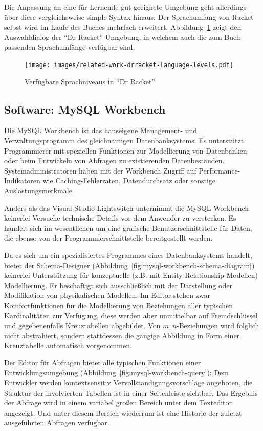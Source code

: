 Die Anpassung an eine für Lernende gut geeignete Umgebung geht allerdings über diese vergleichsweise simple Syntax hinaus: Der Sprachumfang von Racket selbst wird im Laufe des Buches mehrfach erweitert. Abbildung~\ref{fig:drracket-language-levels} zeigt den Auswahldialog der ``Dr Racket''-Umgebung, in welchem auch die zum Buch passenden Sprachumfänge verfügbar sind.

\begin{figure}[h]
  \centering \texttt{[image: images/related-work-drracket-language-levels.pdf]}
  \caption{Verfügbare Sprachniveaus in ``Dr Racket''}
  \label{fig:drracket-language-levels}
\end{figure}

\cleartoleftpage

\subsection{Software: MySQL Workbench}

Die MySQL Workbench ist das hauseigene Management- und Verwaltungsprogramm des gleichnamigen Datenbanksystems. Es unterstützt Programmierer mit speziellen Funktionen zur Modellierung von Datenbanken oder beim Entwickeln von Abfragen zu existierenden Datenbeständen. Systemadministratoren haben mit der Workbench Zugriff auf Performance-Indikatoren wie Caching-Fehlerraten, Datendurchsatz oder sonstige Auslastungsmerkmale.

Anders als das Visual Studio Lightswitch unternimmt die MySQL Workbench keinerlei Versuche technische Details vor dem Anwender zu verstecken. Es handelt sich im wesentlichen um eine grafische Benutzerschnittstelle für Daten, die ebenso von der Programmierschnittstelle bereitgestellt werden.

Da es sich um ein spezialisiertes Programmes eines Datenbanksystems handelt, bietet der Schema-Designer (Abbildung~\ref{fig:mysql-workbench-schema-diagram}) keinerlei Unterstützung für konzeptuelle (z.B. mit Entity-Relationship-Modellen) Modellierung. Er beschäftigt sich ausschließlich mit der Darstellung oder Modifikation von physikalischen Modellen. Im Editor stehen zwar Komfortfunktionen für die Modellierung von Beziehungen aller typischen Kardinalitäten zur Verfügung, diese werden aber unmittelbar auf Fremdschlüssel und gegebenenfalls Kreuztabellen abgebildet. Von $m:n$-Beziehungen wird folglich nicht abstrahiert, sondern stattdessen die gängige Abbildung in Form einer Kreuztabelle automatisch vorgenommen.

Der Editor für Abfragen bietet alle typischen Funktionen einer Entwicklungsumgebung (Abbildung~\ref{fig:mysql-workbench-query}): Dem Entwickler werden kontextsensitiv Vervollständigungsvorschläge angeboten, die Struktur der involvierten Tabellen ist in einer Seitenleiste sichtbar. Das Ergebnis der Abfrage wird in einem variabel großen Bereich unter dem Texteditor angezeigt. Und unter diesem Bereich wiederrum ist eine Historie der zuletzt ausgeführten Abfragen verfügbar.

